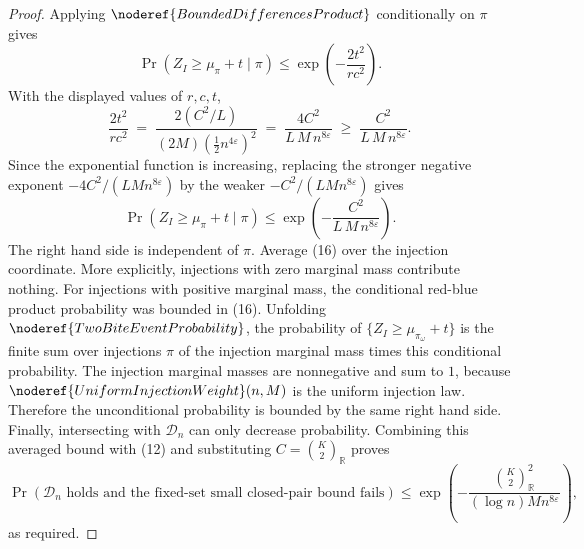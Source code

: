 \begin{proof}
Applying \(\noderef{BoundedDifferencesProduct}\) conditionally on \(\pi\)
gives
\[
\Pr(Z_I\ge\mu_\pi+t\mid\pi)
\le
\exp\!\left(-\frac{2t^2}{r c^2}\right).
\]
With the displayed values of \(r,c,t\),
\[
\frac{2t^2}{r c^2}
\;=\;
\frac{2(C^2/L)}
     {(2M)\left(\frac12 n^{4\varepsilon}\right)^2}
\;=\;
\frac{4C^2}{L\,M\,n^{8\varepsilon}}
\;\ge\;
\frac{C^2}{L\,M\,n^{8\varepsilon}}.
\]
Since the exponential function is increasing, replacing the stronger negative
exponent \(-4C^2/(L M n^{8\varepsilon})\) by the weaker
\(-C^2/(L M n^{8\varepsilon})\) gives
\[
\Pr(Z_I\ge\mu_\pi+t\mid\pi)
\le
\exp\!\left(
-\frac{C^2}{L\,M\,n^{8\varepsilon}}
\right). \tag{16}
\]
The right hand side is independent of \(\pi\).  Average (16) over the injection
coordinate.  More explicitly, injections with zero marginal mass contribute
nothing.  For injections with positive marginal mass, the conditional
red-blue product probability was bounded in (16).  Unfolding
\(\noderef{TwoBiteEventProbability}\), the probability of
\(\{Z_I\ge\mu_{\pi_\omega}+t\}\) is the finite sum over injections \(\pi\) of
the injection marginal mass times this conditional probability.  The injection
marginal masses are nonnegative and sum to \(1\), because
\(\noderef{UniformInjectionWeight}(n,M)\) is the uniform injection law.
Therefore the unconditional probability is bounded by the same right hand
side.  Finally, intersecting with \(\mathcal D_n\) can only decrease
probability.  Combining this averaged bound with (12) and substituting
\(C=\binom{K}{2}_{\mathbb R}\) proves
\[
\Pr\!\left(
\mathcal D_n\text{ holds and the fixed-set small closed-pair bound fails}
\right)
\le
\exp\!\left(
-\frac{\binom{K}{2}_{\mathbb R}^2}
 {(\log n)M n^{8\varepsilon}}
\right),
\]
as required.
\end{proof}
